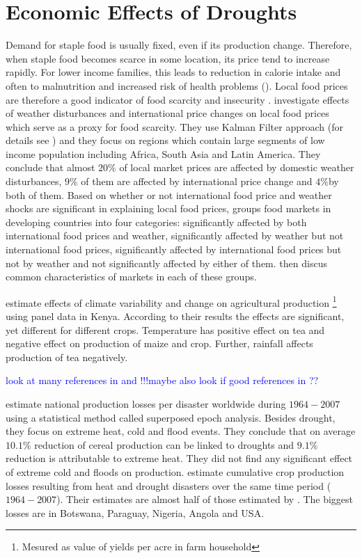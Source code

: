 \documentclass[a4paper,12pt]{article}
\begin{document}
 \section*{Economic Effects of Droughts}
 
Demand for staple food is usually fixed, even if its production change. Therefore, when staple food becomes scarce in some location, its price tend to increase rapidly. For lower income families, this leads to reduction in calorie intake and often to malnutrition and increased risk of health problems (\citealp{Golden2011, Handa2006}). Local food prices are therefore a good indicator of food scarcity and insecurity \citep{Brown2015}. \cite{Brown2015} investigate effects of weather disturbances and international price changes on local food prices which serve as a proxy for food scarcity. They use Kalman Filter approach (for details see \cite{KoopmanSJ}) and they focus on regions which contain large segments of low income population including Africa, South Asia and Latin America. They conclude that almost $20\%$ of local market prices are affected by domestic weather disturbances, $9\%$ of them are affected by international price change and $4\%$by both of them. Based on whether or not international food price and weather shocks are significant in explaining local food prices,\cite{brown2014book} groups food markets in developing countries into four categories: significantly affected by both international food prices and weather, significantly affected by weather but not international food prices, significantly affected by international food prices but not by weather and not significantly affected by either of them. \cite{brown2014book} then discus common characteristics of markets in each of these groups.

\cite{Ochieng2016} estimate effects of climate variability and change on agricultural production \footnote{Mesured as value of yields per acre in farm household} using panel data in Kenya. According to their results the effects are significant, yet different for different crops. Temperature has positive effect on tea and negative effect on production of maize and crop. Further, rainfall affects production of tea negatively.





\textcolor{blue}{look at many references in \cite{Brown2015} and \cite{Ochieng2016} !!!maybe also look if good references in \cite{OxfamIDS}??}


\cite{Pedram2016} estimate national production losses per disaster worldwide during ${1964-2007}$ using a statistical method called superposed epoch analysis. Besides drought, they focus on extreme heat, cold and flood events. They conclude that on average $10.1\%$ reduction of cereal production can be linked to droughts and $9.1\%$ reduction is attributable to extreme heat. They did not find any significant effect of extreme cold and floods on production. \cite{Mehrabi2017} estimate cumulative crop production losses resulting from heat and drought disasters over the same time period (${1964-2007}$). Their estimates are almost half of those estimated by \cite{Pedram2016}. The biggest losses are in Botswana, Paraguay, Nigeria, Angola and USA.
\end{document}
